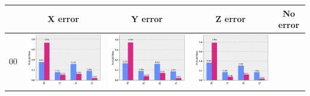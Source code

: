 \documentclass[11pt]{article}
\begin{document}
\begin{table}[h!]
\centering
\begin{tabular}{| c | c | c | c | c | }
    \hline
    & X error & Y error & Z error & No error \\ 
    \hline
    00 & 
    \begin{minipage}{.215\textwidth}
    \includegraphics[width=\linewidth]{img/rand_qecc3_X00.png}
    \end{minipage}&
    \begin{minipage}{.215\textwidth}
    \includegraphics[width=\linewidth]{img/rand_qecc3_Y00.png}
    \end{minipage}
    &\begin{minipage}{.215\textwidth}
    \includegraphics[width=\linewidth]{img/rand_qecc3_Z00.png}

\end{minipage}
\end{tabular}
\end{table}
\end{document}
